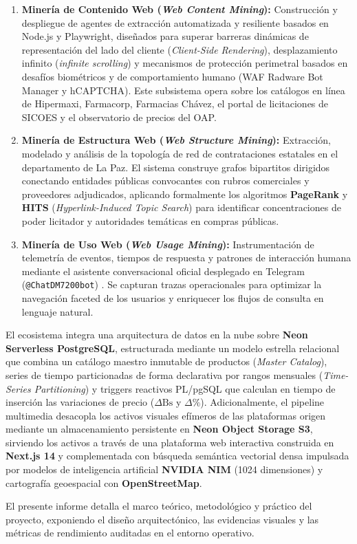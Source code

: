 \begin{enumerate}[leftmargin=*, label=\textbf{\arabic*.}]
    \item \textbf{Minería de Contenido Web (\textit{Web Content Mining}):} Construcción y despliegue de agentes de extracción automatizada y resiliente basados en Node.js y Playwright, diseñados para superar barreras dinámicas de representación del lado del cliente (\textit{Client-Side Rendering}), desplazamiento infinito (\textit{infinite scrolling}) y mecanismos de protección perimetral basados en desafíos biométricos y de comportamiento humano (WAF Radware Bot Manager y hCAPTCHA). Este subsistema opera sobre los catálogos en línea de Hipermaxi, Farmacorp, Farmacias Chávez, el portal de licitaciones de SICOES y el observatorio de precios del OAP.
    
    \item \textbf{Minería de Estructura Web (\textit{Web Structure Mining}):} Extracción, modelado y análisis de la topología de red de contrataciones estatales en el departamento de La Paz. El sistema construye grafos bipartitos dirigidos conectando entidades públicas convocantes con rubros comerciales y proveedores adjudicados, aplicando formalmente los algoritmos \textbf{PageRank} \citep{page1998anatomy} y \textbf{HITS} (\textit{Hyperlink-Induced Topic Search}) \citep{kleinberg1999authoritative} para identificar concentraciones de poder licitador y autoridades temáticas en compras públicas.
    
    \item \textbf{Minería de Uso Web (\textit{Web Usage Mining}):} Instrumentación de telemetría de eventos, tiempos de respuesta y patrones de interacción humana mediante el asistente conversacional oficial desplegado en Telegram (\texttt{@ChatDM7200bot}) \citep{srivastava2000web, cooley1999data}. Se capturan trazas operacionales para optimizar la navegación faceted de los usuarios y enriquecer los flujos de consulta en lenguaje natural.
\end{enumerate}

El ecosistema integra una arquitectura de datos en la nube sobre \textbf{Neon Serverless PostgreSQL}, estructurada mediante un modelo estrella relacional que combina un catálogo maestro inmutable de productos (\textit{Master Catalog}), series de tiempo particionadas de forma declarativa por rangos mensuales (\textit{Time-Series Partitioning}) y triggers reactivos PL/pgSQL que calculan en tiempo de inserción las variaciones de precio ($\Delta\text{Bs}$ y $\Delta\%$). Adicionalmente, el pipeline multimedia desacopla los activos visuales efímeros de las plataformas origen mediante un almacenamiento persistente en \textbf{Neon Object Storage S3}, sirviendo los activos a través de una plataforma web interactiva construida en \textbf{Next.js 14} y complementada con búsqueda semántica vectorial densa impulsada por modelos de inteligencia artificial \textbf{NVIDIA NIM} (1024 dimensiones) y cartografía geoespacial con \textbf{OpenStreetMap}.

El presente informe detalla el marco teórico, metodológico y práctico del proyecto, exponiendo el diseño arquitectónico, las evidencias visuales y las métricas de rendimiento auditadas en el entorno operativo.
